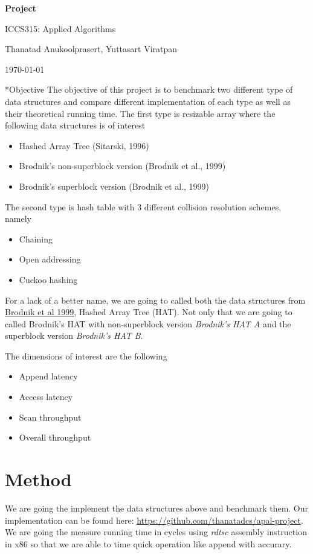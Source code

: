 \documentclass{article} %
\newcommand{\question}[2][]{\begin{flushleft}
        \textbf{Question #1}: \textit{#2}

\end{flushleft}}
\newcommand{\maketitletwo}[2][]{\begin{center}
        \Large{\textbf{Project #1}
            
            ICCS315: Applied Algorithms} %
        \vspace{5pt}
        
        \normalsize{Thanatad Anukoolprasert, Yuttasart Viratpan   %
        
        \today}        %
        \vspace{15pt}
        
\end{center}}
\begin{document}
    \maketitletwo[]  %
    
    \section*{Objective}
    The objective of this project is to benchmark two different type of data structures and compare different
    implementation of each type as well as their theoretical running time.
    The first type is resizable array where the following data structures is of interest
    \begin{itemize}
        \item Hashed Array Tree (Sitarski, 1996)
        \item Brodnik's non-superblock version (Brodnik et al., 1999)
        \item Brodnik's superblock version (Brodnik et al., 1999)
    \end{itemize}
    
    The second type is hash table with 3 different collision resolution schemes, namely
    \begin{itemize}
        \item Chaining
        \item Open addressing
        \item Cuckoo hashing
    \end{itemize}
    
    For a lack of a better name, we are going to called both the data structures from \href{ https://sedgewick.io/wp-content/themes/sedgewick/papers/1999Optimal.pdf}{ Brodnik et al 1999}, Hashed Array Tree (HAT).
    Not only that we are going to called Brodnik's HAT with non-superblock version \emph{Brodnik's HAT A} and the superblock version \emph{Brodnik's HAT B}.

    The dimensions of interest are the following
    \begin{itemize}
        \item Append latency
        \item Access latency
        \item Scan throughput
        \item Overall throughput
    \end{itemize}

    \section*{Method}
    We are going the implement the data structures above and benchmark them. Our implementation can be found here: \href{https://github.com/thanatadcs/apal-project}{ https://github.com/thanatadcs/apal-project}.
    We are going the measure running time in cycles using
    \emph{rdtsc} assembly instruction in x86 so that we are able to time quick operation like append with accurary.
\end{document}
